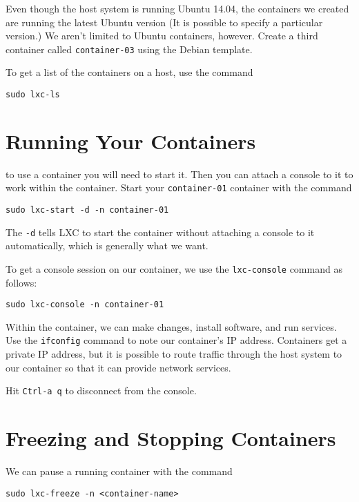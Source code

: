 \documentclass{article}
\begin{document}
Even though the host system is running Ubuntu 14.04, the containers we created are running the latest Ubuntu version (It is possible to specify a particular version.) We aren't limited to Ubuntu containers, however.  Create a third container called \texttt{container-03} using the Debian template.

To get a list of the containers on a host, use the command

\begin{verbatim}
sudo lxc-ls
\end{verbatim}

\section{Running Your Containers}
to use a container you will need to start it.  Then you can attach a console to it to work within the container.  Start your \texttt{container-01} container with the command

\begin{verbatim}
sudo lxc-start -d -n container-01
\end{verbatim}

The \texttt{-d} tells LXC to start the container without attaching a console to it automatically, which is generally what we want.

To get a console session on our container, we use the \texttt{lxc-console} command as follows:

\begin{verbatim}
sudo lxc-console -n container-01
\end{verbatim}

Within the container, we can make changes, install software, and run services. Use the \texttt{ifconfig} command to note our container's IP address. Containers get a private IP address, but it is possible to route traffic through the host system to our container so that it can provide network services.

Hit \texttt{Ctrl-a q} to disconnect from the console.

\section{Freezing and Stopping Containers}

We can pause a running container with the command 

\begin{verbatim}
sudo lxc-freeze -n <container-name>
\end{verbatim} 
\end{document}
